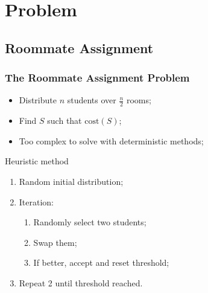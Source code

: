 \section{Problem}
\label{sec:problem}

\subsection{Roommate Assignment}
\begin{frame}
	\frametitle{The Roommate Assignment Problem}
	\begin{itemize}
		\item{Distribute $n$ students over $\frac{n}{2}$ rooms;}
		\vfill
		\item{Find $S$ such that $\mathrm{cost}(S)$;}
		\vfill
		\item{Too complex to solve with deterministic methods;}
	\end{itemize}
\pause
	\begin{block}{Heuristic method}
		\begin{enumerate}
			\item{Random initial distribution;}
			\item{Iteration:
			\begin{enumerate}
				\item{Randomly select two students;}
				\item{Swap them;}
				\item{If better, accept and reset threshold;}
			\end{enumerate}
			}
			\item{Repeat 2 until threshold reached.}
		\end{enumerate}
	\end{block}
\end{frame}

